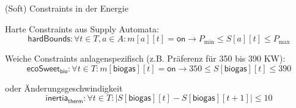 \documentclass[handout,10pt,xcolor={dvipsnames},fleqn]{beamer}
\begin{document}
\begin{frame}{(Soft) Constraints in der Energie}

\alert{Harte} Constraints aus Supply Automata:
\begin{equation}
\mathsf{hardBounds}: \forall t \in T, a \in A : m[a][t] = \mathsf{on} \rightarrow P_{\mathrm{min}} \leq S[a][t] \leq P_{\mathrm{max}} \nonumber
\end{equation}

\pause
\vspace*{2ex}
\alert{Weiche} Constraints anlagenspezifisch (z.B. Präferenz für 350 bis 390 KW):
\begin{equation}
\mathsf{ecoSweet}_{\mathsf{bio}}: \forall t \in T : m[\mathsf{biogas}][t] = \mathsf{on} \rightarrow 350 \leq S[\mathsf{biogas}][t] \leq 390 \nonumber
\end{equation}

\pause
\vspace*{2ex}
oder Änderungsgeschwindigkeit
\begin{equation}
\mathsf{inertia}_{\mathsf{therm}}: \forall t \in T : |S[\mathsf{biogas}][t] - S[\mathsf{biogas}][t+1] | \leq 10 \nonumber
\end{equation}
\end{frame}


\end{document}
